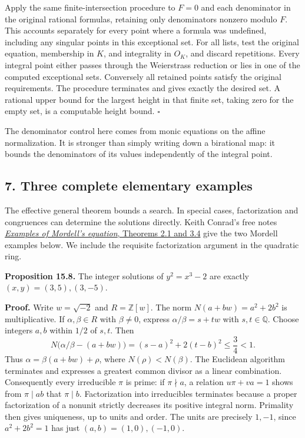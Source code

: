 \documentclass[
  11pt,
  a4paper,
]{article}
\begin{document}
Apply the same finite-intersection procedure to \(F=0\) and each
denominator in the original rational formulas, retaining only
denominators nonzero modulo \(F\). This accounts separately for every
point where a formula was undefined, including any singular points in
this exceptional set. For all lists, test the original equation,
membership in \(K\), and integrality in \(O_K\), and discard
repetitions. Every integral point either passes through the Weierstrass
reduction or lies in one of the computed exceptional sets. Conversely
all retained points satisfy the original requirements. The procedure
terminates and gives exactly the desired set. A rational upper bound for
the largest height in that finite set, taking zero for the empty set, is
a computable height bound. \(\square\)

The denominator control here comes from monic equations on the affine
normalization. It is stronger than simply writing down a birational map:
it bounds the denominators of its values independently of the integral
point.

\subsection{7. Three complete elementary
examples}\label{three-complete-elementary-examples}

The effective general theorem bounds a search. In special cases,
factorization and congruences can determine the solutions directly.
Keith Conrad's free notes
\href{https://kconrad.math.uconn.edu/blurbs/gradnumthy/mordelleqn1.pdf}{\emph{Examples
of Mordell's equation}, Theorems 2.1 and 3.4} give the two Mordell
examples below. We include the requisite factorization argument in the
quadratic ring.

\textbf{Proposition 15.8.} The integer solutions of \(y^2=x^3-2\) are
exactly \((x,y)=(3,5),(3,-5)\).

\textbf{Proof.} Write \(w=\sqrt{-2}\) and \(R=\mathbb Z[w]\). The norm
\(N(a+bw)=a^2+2b^2\) is multiplicative. If \(\alpha,\beta\in R\) with
\(\beta\ne0\), express \(\alpha/\beta=s+tw\) with \(s,t\in\mathbb Q\).
Choose integers \(a,b\) within \(1/2\) of \(s,t\). Then \[
N\bigl(\alpha/\beta-(a+bw)\bigr)
 =(s-a)^2+2(t-b)^2\le\frac34<1.
\tag{15.37}
\] Thus \(\alpha=\beta(a+bw)+\rho\), where \(N(\rho)<N(\beta)\). The
Euclidean algorithm terminates and expresses a greatest common divisor
as a linear combination. Consequently every irreducible \(\pi\) is
prime: if \(\pi\nmid a\), a relation \(u\pi+va=1\) shows from
\(\pi\mid ab\) that \(\pi\mid b\). Factorization into irreducibles
terminates because a proper factorization of a nonunit strictly
decreases its positive integral norm. Primality then gives uniqueness,
up to units and order. The units are precisely \(1,-1\), since
\(a^2+2b^2=1\) has just \((a,b)=(1,0),(-1,0)\).
\end{document}
